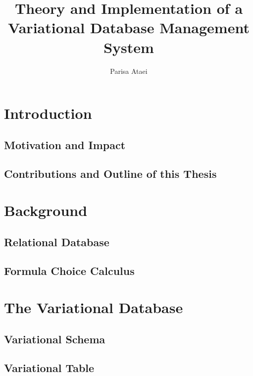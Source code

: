 \documentclass[onehalf,11pt]{beavtex}
\title{Theory and Implementation of a Variational Database Management System}
\author{Parisa Ataei}
\begin{document}
\maketitle

\mainmatter


\chapter{Introduction}
\label{ch:introduction}

\section{Motivation and Impact}
\label{sec:motivation}

\section{Contributions and Outline of this Thesis}
\label{sec:contributions}


\chapter{Background}
\label{ch:background}

\section{Relational Database}
\label{sec:rdb}

\section{Formula Choice Calculus}
\label{sec:fcc}


\chapter{The Variational Database}
\label{ch:vdb}

\section{Variational Schema}
\label{sec:vschema}

\section{Variational Table}
\label{sec:vtable}
\end{document}
